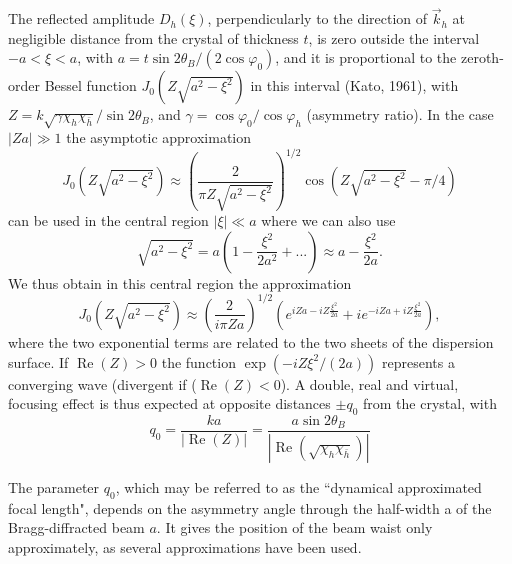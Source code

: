 \documentclass[preprint]{iucr}              %
\newcommand{\inblue}[1]{{\color{black}#1}}
\begin{document}
The reflected amplitude $D_h(\xi)$, perpendicularly to the direction of $\vec k_h$ at negligible distance from the crystal of thickness $t$, is zero outside the interval $-a<\xi<a$, with $a=t \sin2\theta_B/(2 \cos\varphi_0)$, and it is proportional to the zeroth-order Bessel function  $J_0(Z\sqrt{a^2-\xi^2})$ in this interval (Kato, 1961), with  $Z=k\sqrt{\gamma\chi_h\chi_{\bar h}}/\sin2\theta_B$, and $\gamma=\cos\varphi_0/\cos\varphi_h$ (asymmetry ratio). In the case $|Z a| \gg 1$ the asymptotic approximation
\begin{equation}
    J_0(Z\sqrt{a^2-\xi^2})\approx \left(\frac{2}{\pi Z \sqrt{a^2-\xi^2}}\right)^{1/2} \cos(Z\sqrt{a^2-\xi^2}-\pi/4)
\end{equation}
can be used in the central region $|\xi|\ll a$ where we can also use
\begin{equation}
     \sqrt{a^2-\xi^2} = a (1-\frac{\xi^2}{2a^2}+...)\approx a - \frac{\xi^2}{2a}.
\end{equation}
We thus obtain in this central region the approximation
\begin{equation}
\label{eq:approximatedDiffractedField}
    J_0(Z\sqrt{a^2-\xi^2})\approx \left(\frac{2}{i \pi Z a}\right)^{1/2} \left( e^{iZa-i Z\frac{ \xi^2}{2a}} + i 
    e^{-i Z a+i Z\frac{\xi^2}{2a}} \right),
\end{equation}
where the two exponential terms are related to the two sheets of the dispersion surface. 
If $\operatorname{Re}(Z)>0$ the function $\exp(- i Z \xi^2 / (2 a))$ 
represents a converging wave (divergent if  ($\operatorname{Re}(Z)<0$). A double, real and virtual, focusing effect is thus expected at opposite distances $\pm q_0$ from the crystal, with
\begin{equation}
\label{eq:q0}
    q_0 = \frac{k a}{|\operatorname{Re}(Z)|}= \frac{a \sin2\theta_B}{|\operatorname{Re}(\sqrt{\chi_h\chi_{\bar h}})|}
\end{equation}

The parameter $q_0$, which may be referred to as the ``dynamical \inblue{approximated} focal length", depends on the asymmetry angle \inblue{through} the half-width a of the Bragg-diffracted beam $a$. \inblue{It gives the position of the beam waist only approximately, as several approximations have been used}.
\end{document}
